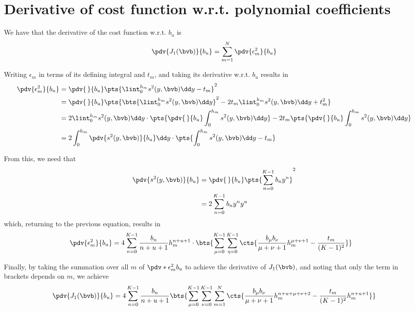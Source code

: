 \section{Derivative of cost function w.r.t. polynomial coefficients}
\label{app:appB:derivative}

We have that the derivative of the cost function w.r.t. $b_u$ is
\begin{equation}
	\pdv{J_1(\bvb)}{b_u} = \sum_{m=1}^{N} \pdv{\epsilon_m^2}{b_u}
\end{equation}

Writing $\epsilon_m$ in terms of its defining integral and $t_m$, and taking its derivative w.r.t. $b_u$ results in
\begin{equation}
	\begin{split}
		\pdv{\epsilon_m^2}{b_u}
		& = \pdv{\,}{b_u} \pts{ \lint_{0}^{h_m} s^2(y,\bvb) \dd y - t_m }^2 \\
		& = \pdv{\,}{b_u} \pts{ \bts{\lint_{0}^{h_m} s^2(y,\bvb) \dd y}^2 - 2t_m\lint_{0}^{h_m} s^2(y,\bvb) \dd y + t_m^2 } \\
		& = 2\lint_{0}^{h_m}s^2(y,\bvb)\dd y \cdot \pts{ \pdv{\,}{b_u} \int_{0}^{h_m} s^2(y,\bvb) \dd y } - 2 t_m \pts{ \pdv{\,}{b_u} \int_{0}^{h_m} s^2(y,\bvb) \dd y } \\
		& = 2\int_{0}^{h_m} \pdv{s^2(y,\bvb)}{b_u} \dd y \cdot \pts{\int_{0}^{h_m} s^2(y,\bvb) \dd y - t_m}
	\end{split}
\end{equation}

From this, we need that
\begin{equation}
	\begin{split}
		\pdv{s^2(y,\bvb)}{b_u}
		& = \pdv{\,}{b_u} \pts{ \sum_{n=0}^{K-1} b_n y^n}^2 \\
		& = 2\sum_{n=0}^{K-1} b_n y^n y^u
	\end{split}
\end{equation}
which, returning to the previous equation, results in
\begin{equation}
	\begin{split}
		\pdv{\epsilon_m^2}{b_u}
		& = 4\sum_{n=0}^{K-1} \frac{b_n}{n+u+1} h_m^{n+u+1} \cdot\bts{ \sum_{\mu=0}^{K-1} \sum_{\eta=0}^{K-1} \cts{\frac{b_\mu b_\nu}{\mu+\nu+1} h_m^{\mu+\nu+1} - \frac{t_m}{(K-1)^2} } }
	\end{split}
\end{equation}

Finally, by taking the summation over all $m$ of $\pdv*{\epsilon_m^2}{b_u}$ to achieve the derivative of $J_1(\bvb)$, and noting that only the term in brackets depends on $m$, we achieve 
\begin{equation}
	\pdv{J_1(\bvb)}{b_u} = 4 \sum_{n=0}^{K-1} \frac{b_n}{n+u+1} \bts{ \sum_{\mu=0}^{K-1} \sum_{\nu=0}^{K-1} \sum_{m=1}^{N} \cts{\frac{b_\mu b_\nu }{\mu+\nu+1} h_m^{n+u+\mu+\nu+2} - \frac{t_m}{(K-1)^2}h_m^{n+u+1}} }
\end{equation}